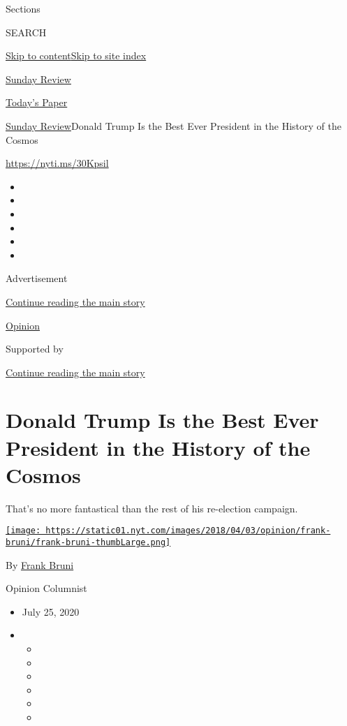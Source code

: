 Sections

SEARCH

\protect\hyperlink{site-content}{Skip to
content}\protect\hyperlink{site-index}{Skip to site index}

\href{https://www.nytimes.com/section/opinion/sunday}{Sunday Review}

\href{https://myaccount.nytimes.com/auth/login?response_type=cookie\&client_id=vi}{}

\href{https://www.nytimes.com/section/todayspaper}{Today's Paper}

\href{/section/opinion/sunday}{Sunday Review}\textbar{}Donald Trump Is
the Best Ever President in the History of the Cosmos

\url{https://nyti.ms/30Kpsil}

\begin{itemize}
\item
\item
\item
\item
\item
\item
\end{itemize}

Advertisement

\protect\hyperlink{after-top}{Continue reading the main story}

\href{/section/opinion}{Opinion}

Supported by

\protect\hyperlink{after-sponsor}{Continue reading the main story}

\hypertarget{donald-trump-is-the-best-ever-president-in-the-history-of-the-cosmos}{%
\section{Donald Trump Is the Best Ever President in the History of the
Cosmos}\label{donald-trump-is-the-best-ever-president-in-the-history-of-the-cosmos}}

That's no more fantastical than the rest of his re-election campaign.

\href{https://www.nytimes.com/by/frank-bruni}{\texttt{[image: https://static01.nyt.com/images/2018/04/03/opinion/frank-bruni/frank-bruni-thumbLarge.png]}}

By \href{https://www.nytimes.com/by/frank-bruni}{Frank Bruni}

Opinion Columnist

\begin{itemize}
\item
  July 25, 2020
\item
  \begin{itemize}
  \item
  \item
  \item
  \item
  \item
  \item
  \end{itemize}
\end{itemize}


